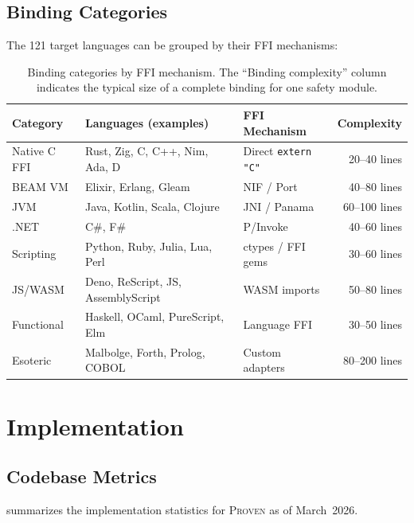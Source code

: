 \documentclass[11pt,a4paper]{article}
\newcommand{\proven}{\textsc{Proven}}
\newcommand{\code}[1]{\texttt{#1}}
\begin{document}
\subsection{Binding Categories}
\label{sec:binding-categories}

The 121 target languages can be grouped by their FFI mechanisms:

\begin{table}[t]
\centering
\small
\caption{Binding categories by FFI mechanism. The ``Binding complexity''
column indicates the typical size of a complete binding for one safety
module.}
\label{tab:binding-categories}
\begin{tabularx}{\textwidth}{@{}lXlr@{}}
\toprule
\textbf{Category} & \textbf{Languages (examples)} & \textbf{FFI Mechanism} & \textbf{Complexity} \\
\midrule
Native C FFI & Rust, Zig, C, C++, Nim, Ada, D & Direct \code{extern "C"} & 20--40 lines \\
BEAM VM & Elixir, Erlang, Gleam & NIF / Port & 40--80 lines \\
JVM & Java, Kotlin, Scala, Clojure & JNI / Panama & 60--100 lines \\
.NET & C\#, F\# & P/Invoke & 40--60 lines \\
Scripting & Python, Ruby, Julia, Lua, Perl & ctypes / FFI gems & 30--60 lines \\
JS/WASM & Deno, ReScript, JS, AssemblyScript & WASM imports & 50--80 lines \\
Functional & Haskell, OCaml, PureScript, Elm & Language FFI & 30--50 lines \\
Esoteric & Malbolge, Forth, Prolog, COBOL & Custom adapters & 80--200 lines \\
\bottomrule
\end{tabularx}
\end{table}


\section{Implementation}
\label{sec:implementation}

\subsection{Codebase Metrics}

 summarizes the implementation statistics for \proven{}
as of March~2026.
\end{document}
